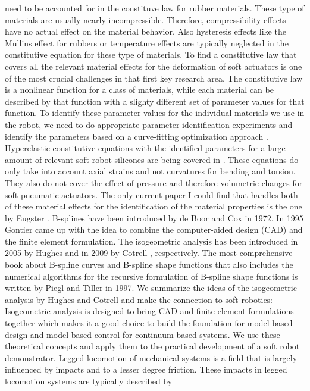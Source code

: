 need to be accounted for in the constituve law for rubber materials. These type of materials are usually nearly incompressible. Therefore, compressibility effects have no actual effect
on the material behavior. Also hysteresis effects like the Mullins effect for rubbers or temperature effects are typically neglected in the constitutive equation for these type of materials. To find
a constitutive law that covers all the relevant material effects for the deformation of soft actuators is one of the most crucial challenges in that first key research area. The constitutive
law is a nonlinear function for a class of materials, while each material can be described by that function with a slighty different set of parameter values for that function. To identify these 
parameter values for the individual materials we use in the robot, we need to do appropriate parameter identification experiments and identify the parameters based on a curve-fitting optimization
approach \cite{Gao2012}. Hyperelastic constitutive equations with the identified parameters for a large amount of relevant soft robot silicones are being covered in \cite{Marechal2021}. These equations
do only take into account axial strains and not curvatures for bending and torsion. They also do not cover the effect of pressure and therefore volumetric changes for soft pneumatic
actuators. The only current paper I could find that handles both of these material effects for the identification of the material properties is the one by Eugster \cite{Eugster2022}.
%
B-splines have been introduced by de Boor \cite{Boor1972} and Cox \cite{Cox1972} in 1972. In 1995 Gontier \cite{Gontier1995} came up with the idea to combine the
 computer-aided design (CAD) and the finite element formulation. The isogeometric analysis has been introduced in 2005 by Hughes \cite{Hughes2005} and in 2009 by
 Cotrell \cite{Cotrell2009}, respectively. The most comprehensive book about B-spline curves and B-spline shape functions that also includes the numerical algorithms
for the recursive formulation of B-spline shape functions is written by Piegl and Tiller \cite{Piegl1997_book} in 1997. We summarize the ideas of the isogeometric analysis by Hughes and
Cotrell and make the connection to soft robotics: 
%
Isogeometric analysis is designed to bring CAD and finite element formulations together which makes it a good choice to build the foundation for model-based design
 and model-based control for continuum-based systems. We use these theoretical concepts and apply them to the practical development of a soft robot demonstrator. 
%
Legged locomotion of mechanical systems is a field that is largely influenced by impacts and to a lesser degree friction. These impacts in legged locomotion systems are typically described by 
